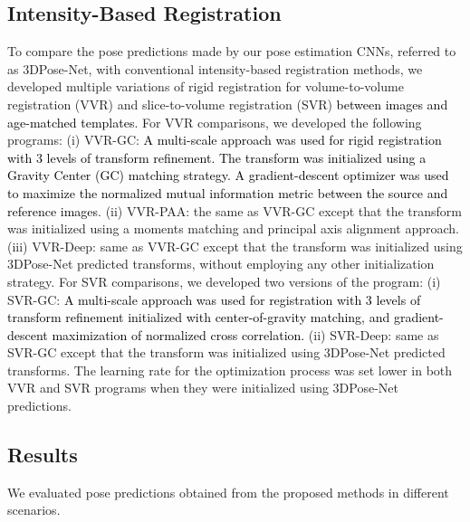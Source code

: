 \documentclass[journal,transmag]{IEEEtran}
\begin{document}
\subsection{Intensity-Based Registration}
To compare the pose predictions made by our pose estimation CNNs, referred to as 3DPose-Net, with conventional intensity-based registration methods, we developed multiple variations of rigid registration for volume-to-volume registration (VVR) and slice-to-volume registration (SVR) \textcolor{black}{between images and age-matched templates}. For VVR comparisons, we developed the following programs: (i) VVR-GC: \textcolor{black}{A multi-scale approach was used for rigid registration with 3 levels of transform refinement. The transform was initialized using a Gravity Center (GC) matching strategy. A gradient-descent optimizer was used to maximize the normalized mutual information metric between the source and reference images}. (ii) VVR-PAA: the same as VVR-GC except that the transform was initialized using a moments matching and principal axis alignment approach. (iii) VVR-Deep: same as VVR-GC except that the transform was initialized using 3DPose-Net predicted transforms, without employing any other initialization strategy. For SVR comparisons, we developed two versions of the program: (i) SVR-GC: \textcolor{black}{A multi-scale approach was used for registration with 3 levels of transform refinement initialized with center-of-gravity matching, and gradient-descent maximization of normalized cross correlation.} (ii) SVR-Deep: same as SVR-GC except that the transform was initialized using 3DPose-Net predicted transforms. The learning rate for the optimization process was set lower in both VVR and SVR programs when they were initialized using 3DPose-Net predictions.

\subsection{Results}
We evaluated pose predictions obtained from the proposed methods in different scenarios. 
\end{document}
